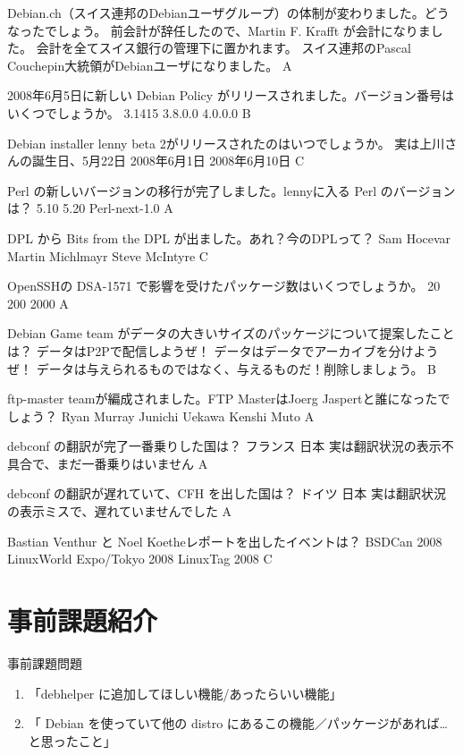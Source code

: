 \documentclass[cjk,dvipdfmx,12pt]{beamer}
\begin{document}
 \santaku
 {Debian.ch（スイス連邦のDebianユーザグループ）の体制が変わりました。どうなったでしょう。}
 {前会計が辞任したので、Martin F. Krafft が会計になりました。}
 {会計を全てスイス銀行の管理下に置かれます。}
 {スイス連邦のPascal Couchepin大統領がDebianユーザになりました。}
 {A}

 \santaku
 {2008年6月5日に新しい Debian Policy がリリースされました。バージョン番号はいくつでしょうか。}
 {3.1415}
 {3.8.0.0}
 {4.0.0.0}
 {B}
 
 \santaku
 {Debian installer lenny beta 2がリリースされたのはいつでしょうか。}
 {実は上川さんの誕生日、5月22日}
 {2008年6月1日}
 {2008年6月10日}
 {C}

 \santaku
 {Perl の新しいバージョンの移行が完了しました。lennyに入る Perl のバージョンは？ }
 {5.10}
 {5.20}
 {Perl-next-1.0}
 {A}

 \santaku
 {DPL から Bits from the DPL が出ました。あれ？今のDPLって？}
 {Sam Hocevar}
 {Martin Michlmayr}
 {Steve McIntyre}
 {C}

 \santaku
 {OpenSSHの DSA-1571 で影響を受けたパッケージ数はいくつでしょうか。}
 {20}
 {200}
 {2000}
 {A}

 \santaku
 {Debian Game team がデータの大きいサイズのパッケージについて提案したことは？}
 {データはP2Pで配信しようぜ！}
 {データはデータでアーカイブを分けようぜ！}
 {データは与えられるものではなく、与えるものだ！削除しましょう。}
 {B}

 \santaku
 {ftp-master teamが編成されました。FTP MasterはJoerg Jaspertと誰になったでしょう？}
 {Ryan Murray}
 {Junichi Uekawa}
 {Kenshi Muto}
 {A}

 \santaku
 {debconf の翻訳が完了一番乗りした国は？}
 {フランス}
 {日本}
 {実は翻訳状況の表示不具合で、まだ一番乗りはいません}
 {A}

 \santaku
 {debconf の翻訳が遅れていて、CFH を出した国は？}
 {ドイツ}
 {日本}
 {実は翻訳状況の表示ミスで、遅れていませんでした}
 {A}

 \santaku
 {Bastian Venthur と Noel Koetheレポートを出したイベントは？}
 {BSDCan 2008}
 {LinuxWorld Expo/Tokyo 2008}
 {LinuxTag 2008}
 {C}

\section{事前課題紹介}

\begin{frame}{事前課題問題}

\begin{enumerate}
 \item 「debhelper に追加してほしい機能/あったらいい機能」
 \item 「 Debian を使っていて他の distro にあるこの機能／パッケージがあれば…と思ったこと」
\end{enumerate}

\end{frame}
\end{document}
